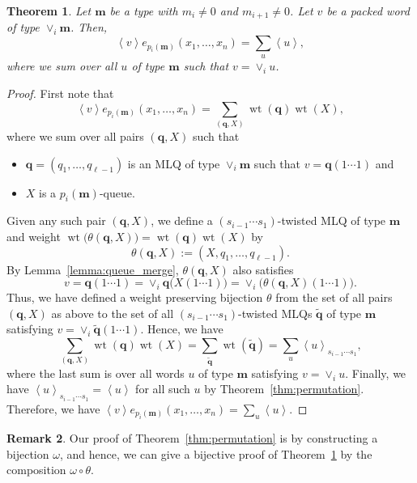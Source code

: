 \documentclass[reqno]{amsart}
\newcommand{\0}{\phantom{c}}
\newcommand{\swt}[1]{\left\langle #1 \right\rangle} %
\newcommand{\merge}[1]{\vee_{#1}} %
\DeclareMathOperator{\wt}{wt} %
\newcommand{\mm}{\mathbf{m}}
\newcommand{\qq}{\mathbf{q}}
\let\sumnonlimits\sum
\renewcommand{\sum}{\sumnonlimits\limits}
\newcommand{\tup}[1]{\left( #1 \right)}
\theoremstyle{plain}
\newtheorem{thm}{Theorem}[section]
\theoremstyle{definition}
\newtheorem{remark}[thm]{Remark}
\numberwithin{equation}{section}
\begin{document}
\begin{thm}
\label{thm:merge}
  Let $\mm$ be a type with $m_i \neq 0$ and $m_{i+1} \neq 0$.
  Let $v$ be a packed word of type $\merge{i}\mm$.
  Then,
\[
  \swt{v} e_{p_i(\mm)}(x_1, \dotsc, x_n) = \sum_u \swt{u},
\]
where we sum over all $u$ of type $\mm$ such that $v = \merge{i} u$.
\end{thm}

\begin{proof}
  First note that
  \[
  \swt{v} e_{p_i(\mm)}(x_1, \dotsc, x_n) = \sum_{(\qq,X)} \wt(\qq) \wt(X),
  \]
  where we sum over all pairs $(\qq, X)$ such that
  \begin{itemize}
  \item $\qq = (q_1, \dotsc, q_{\ell-1})$ is an MLQ of type $\merge{i}\mm$ such that $v = \qq(1\cdots1)$ and
  \item $X$ is a $p_i(\mm)$-queue.
  \end{itemize}
  Given any such pair $\tup{\qq, X}$, we define a $(s_{i-1} \dotsm s_1)$-twisted MLQ of type $\mm$ and weight
  $\wt\bigl( \theta(\qq, X) \bigr) = \wt(\qq) \wt(X)$ by
  \[
  \theta(\qq, X) := (X, q_1, \dotsc, q_{\ell-1}).
  \]
  By Lemma~\ref{lemma:queue_merge}, $\theta(\qq, X)$ also satisfies
  \[
  v = \qq(1 \dotsm 1) = \merge{i} \qq\bigl( X(1 \dotsm 1) \bigr) = \merge{i} \bigl( \theta(\qq, X)(1 \dotsm 1) \bigr).
  \]
  Thus, we have defined a weight preserving bijection $\theta$ from the set of all pairs $\tup{\qq, X}$ as above
  to the set of all $(s_{i-1} \dotsm s_1)$-twisted MLQs $\widetilde{\qq}$ of type $\mm$ satisfying $v = \merge{i} \widetilde{\qq} \tup{1 \dotsm 1}$.
  Hence, we have
  \[
  \sum_{(\qq,X)} \wt(\qq) \wt(X)
  = \sum_{\widetilde{\qq}} \wt(\widetilde{\qq})
  = \sum_u \swt{u}_{s_{i-1} \dotsm s_1} ,
  \]
  where the last sum is over all words $u$ of type $\mm$ satisfying $v = \merge{i} u$.
  Finally, we have $\swt{u}_{s_{i-1} \dotsm s_1} = \swt{u}$ for all such $u$ by Theorem~\ref{thm:permutation}.
  Therefore, we have $\swt{v} e_{p_i(\mm)}(x_1, \dotsc, x_n) = \sum_u \swt{u}$.
\end{proof}

\begin{remark}
Our proof of Theorem~\ref{thm:permutation} is by constructing a bijection $\omega$, and hence, we can give a bijective proof of Theorem~\ref{thm:merge} by the composition $\omega \circ \theta$.
\end{remark}
\end{document}
